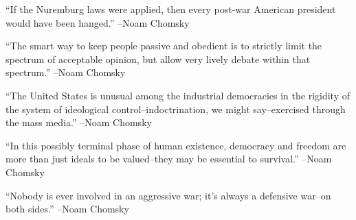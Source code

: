 \documentclass{article}%
\begin{document}
\linebreak%
\vspace{1mm}%
\begin{minipage}{\textwidth}%
\flushleft%
“If the Nuremburg laws were applied, then every post{-}war American president would have been hanged.”%
\linebreak%
\vspace{1mm}%
–Noam Chomsky%
\linebreak%
\vspace{1mm}%
\end{minipage}%
\linebreak%
\vspace{1mm}%
\begin{minipage}{\textwidth}%
\flushleft%
“The smart way to keep people passive and obedient is to strictly limit the spectrum of acceptable opinion, but allow very lively debate within that spectrum.”%
\linebreak%
\vspace{1mm}%
–Noam Chomsky%
\linebreak%
\vspace{1mm}%
\end{minipage}%
\linebreak%
\vspace{1mm}%
\begin{minipage}{\textwidth}%
\flushleft%
“The United States is unusual among the industrial democracies in the rigidity of the system of ideological control–indoctrination, we might say–exercised through the mass media.”%
\linebreak%
\vspace{1mm}%
–Noam Chomsky%
\linebreak%
\vspace{1mm}%
\end{minipage}%
\linebreak%
\vspace{1mm}%
\begin{minipage}{\textwidth}%
\flushleft%
“In this possibly terminal phase of human existence, democracy and freedom are more than just ideals to be valued–they may be essential to survival.”%
\linebreak%
\vspace{1mm}%
–Noam Chomsky%
\linebreak%
\vspace{1mm}%
\end{minipage}%
\linebreak%
\vspace{1mm}%
\begin{minipage}{\textwidth}%
\flushleft%
“Nobody is ever involved in an aggressive war; it's always a defensive war–on both sides.”%
\linebreak%
\vspace{1mm}%
–Noam Chomsky%
\linebreak%
\vspace{1mm}%
\end{minipage}%
\end{document}
